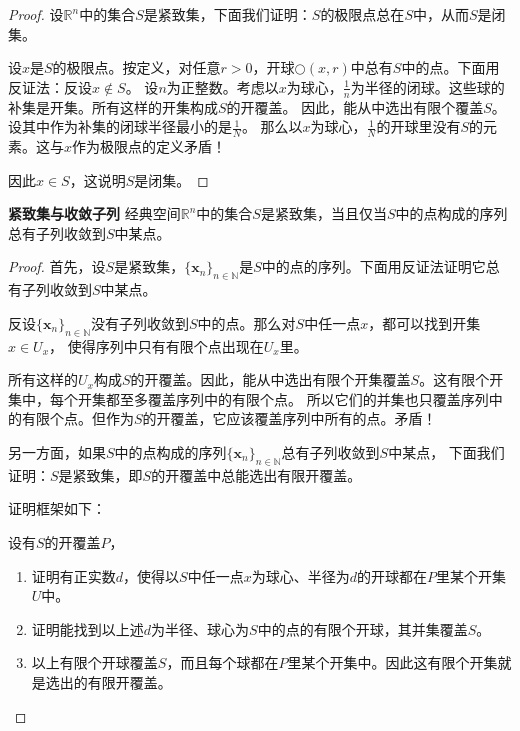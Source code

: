 \documentclass[12pt,UTF8]{ctexbook}
\begin{document}
\begin{appendix}
\begin{proof}
    设$\mathbb{R}^n$中的集合$S$是紧致集，下面我们证明：$S$的极限点总在$S$中，从而$S$是闭集。

    设$x$是$S$的极限点。按定义，对任意$r>0$，开球$\bigcirc(x, r)$中总有$S$中的点。下面用反证法：反设$x\notin S$。
    设$n$为正整数。考虑以$x$为球心，$\frac{1}{n}$为半径的闭球。这些球的补集是开集。所有这样的开集构成$S$的开覆盖。
    因此，能从中选出有限个覆盖$S$。设其中作为补集的闭球半径最小的是$\frac{1}{N}$。
    那么以$x$为球心，$\frac{1}{N}$的开球里没有$S$的元素。这与$x$作为极限点的定义矛盾！

    因此$x\in S$，这说明$S$是闭集。

\end{proof}

\begin{tm}{\textbf{紧致集与收敛子列}}\label{tm:b-2-20}
    经典空间$\mathbb{R}^n$中的集合$S$是紧致集，当且仅当$S$中的点构成的序列总有子列收敛到$S$中某点。
\end{tm}

\begin{proof}
    首先，设$S$是紧致集，$\{\mathbf{x}_n\}_{n\in\mathbb{N}}$是$S$中的点的序列。下面用反证法证明它总有子列收敛到$S$中某点。

    反设$\{\mathbf{x}_n\}_{n\in\mathbb{N}}$没有子列收敛到$S$中的点。那么对$S$中任一点$x$，都可以找到开集$x\in U_x$，
    使得序列中只有有限个点出现在$U_x$里。

    所有这样的$U_x$构成$S$的开覆盖。因此，能从中选出有限个开集覆盖$S$。这有限个开集中，每个开集都至多覆盖序列中的有限个点。
    所以它们的并集也只覆盖序列中的有限个点。但作为$S$的开覆盖，它应该覆盖序列中所有的点。矛盾！
    
    另一方面，如果$S$中的点构成的序列$\{\mathbf{x}_n\}_{n\in\mathbb{N}}$总有子列收敛到$S$中某点，
    下面我们证明：$S$是紧致集，即$S$的开覆盖中总能选出有限开覆盖。

    证明框架如下：

    设有$S$的开覆盖$P$，
    \begin{enumerate}
        \item 证明有正实数$d$，使得以$S$中任一点$x$为球心、半径为$d$的开球都在$P$里某个开集$U$中。
        \item 证明能找到以上述$d$为半径、球心为$S$中的点的有限个开球，其并集覆盖$S$。
        \item 以上有限个开球覆盖$S$，而且每个球都在$P$里某个开集中。因此这有限个开集就是选出的有限开覆盖。
    \end{enumerate}


\end{proof}
\end{appendix}
\end{document}

